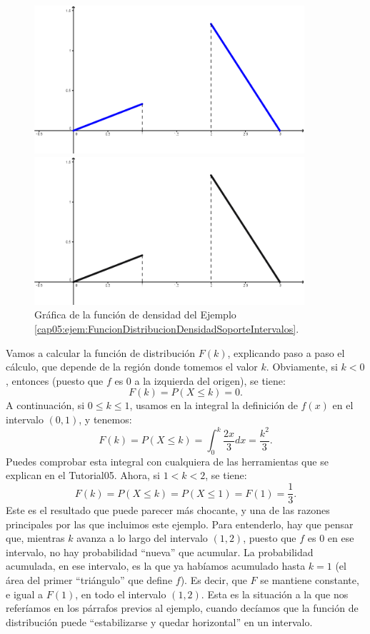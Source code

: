 \begin{ejemplo}
\begin{figure}[bh!]
\begin{center}
\begin{enColor}
\includegraphics[width=10cm]{../fig/Cap05-EjemploFuncionDistribucionDensidadSoporteIntervalos.png}
\end{enColor}
\begin{bn}
\includegraphics[width=10cm]{../fig/Cap05-EjemploFuncionDistribucionDensidadSoporteIntervalos-bn.png}
\end{bn}
\caption{Gráfica de la función de densidad del Ejemplo \ref{cap05:ejem:FuncionDistribucionDensidadSoporteIntervalos}.}
\label{cap05:fig:EjemploFuncionDistribucionDensidadSoporteIntervalos}
\end{center}
\end{figure}
\noindent Vamos a calcular la función de distribución $F(k)$, explicando paso a paso el cálculo, que depende de la región donde tomemos el valor $k$. Obviamente, si $k<0$, entonces (puesto que $f$ es $0$ a la izquierda del origen), se tiene:
\[F(k)=P(X\leq k)=0.\]
A continuación, si $0\leq k\leq 1$, usamos en la integral la definición de $f(x)$ en el intervalo $(0,1)$, y tenemos:
\[F(k)=P(X\leq k)=\int_0^k \dfrac{2x}{3}dx=\dfrac{k^2}{3}.\]
Puedes comprobar esta integral con cualquiera de las herramientas que se explican en el Tutorial05. Ahora, si $1<k<2$, se tiene:
\[F(k)=P(X\leq k)=P(X\leq 1)=F(1)=\dfrac{1}{3}.\]
Este es el resultado que puede parecer más chocante, y una de las razones principales por las que incluimos este ejemplo. Para entenderlo, hay que pensar que, mientras $k$ avanza a lo largo del intervalo $(1,2)$, puesto que $f$ es $0$ en ese intervalo, no hay probabilidad ``nueva'' que  acumular. La probabilidad acumulada, en ese intervalo, es la que ya habíamos acumulado hasta $k=1$ (el área del primer ``triángulo'' que define $f$). Es decir, que $F$ se mantiene constante, e igual a $F(1)$, en todo el intervalo $(1,2)$. Esta es la situación a la que nos referíamos en los párrafos previos al ejemplo, cuando decíamos que la función de distribución puede ``estabilizarse y quedar horizontal'' en un intervalo.


\end{ejemplo}
